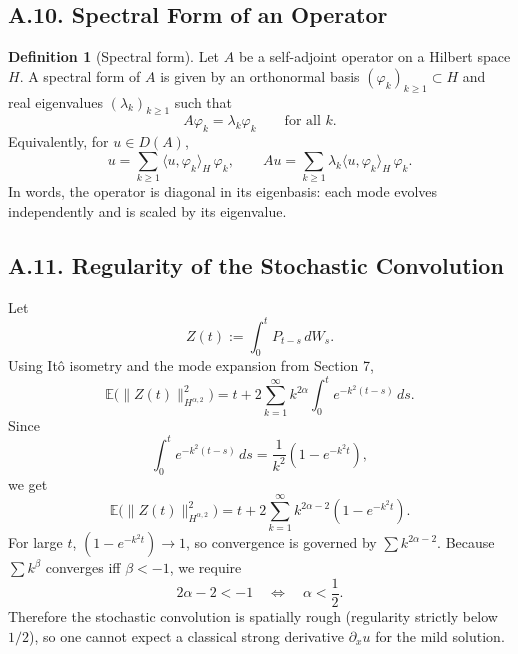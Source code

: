 \documentclass[11pt]{article}
\theoremstyle{definition}
\newtheorem{definition}{Definition}
\theoremstyle{remark}
\begin{document}
\subsection*{A.10. Spectral Form of an Operator}
\begin{definition}[Spectral form]
Let $A$ be a self-adjoint operator on a Hilbert space $H$. A spectral form of $A$ is given by an orthonormal basis $(\varphi_k)_{k\ge1}\subset H$ and real eigenvalues $(\lambda_k)_{k\ge1}$ such that
\[
A\varphi_k=\lambda_k\varphi_k
\qquad\text{for all }k.
\]
Equivalently, for $u\in D(A)$,
\[
u=\sum_{k\ge1}\langle u,\varphi_k\rangle_H\,\varphi_k,
\qquad
Au=\sum_{k\ge1}\lambda_k\langle u,\varphi_k\rangle_H\,\varphi_k.
\]
In words, the operator is diagonal in its eigenbasis: each mode evolves independently and is scaled by its eigenvalue.
\end{definition}

\subsection*{A.11. Regularity of the Stochastic Convolution}
Let
\[
Z(t):=\int_0^t P_{t-s}\,dW_s.
\]
Using It\^o isometry and the mode expansion from Section 7,
\[
\mathbb E\bigl(\|Z(t)\|_{H^{\alpha,2}}^2\bigr)
=
t+2\sum_{k=1}^{\infty}k^{2\alpha}\int_0^t e^{-k^2(t-s)}\,ds.
\]
Since
\[
\int_0^t e^{-k^2(t-s)}\,ds
=
\frac{1}{k^2}(1-e^{-k^2t}),
\]
we get
\[
\mathbb E\bigl(\|Z(t)\|_{H^{\alpha,2}}^2\bigr)
=
t+2\sum_{k=1}^{\infty}k^{2\alpha-2}(1-e^{-k^2t}).
\]
For large $t$, $(1-e^{-k^2t})\to 1$, so convergence is governed by $\sum k^{2\alpha-2}$. Because $\sum k^\beta$ converges iff $\beta<-1$, we require
\[
2\alpha-2<-1
\quad\Longleftrightarrow\quad
\alpha<\frac12.
\]
Therefore the stochastic convolution is spatially rough (regularity strictly below $1/2$), so one cannot expect a classical strong derivative $\partial_xu$ for the mild solution.
\end{document}

